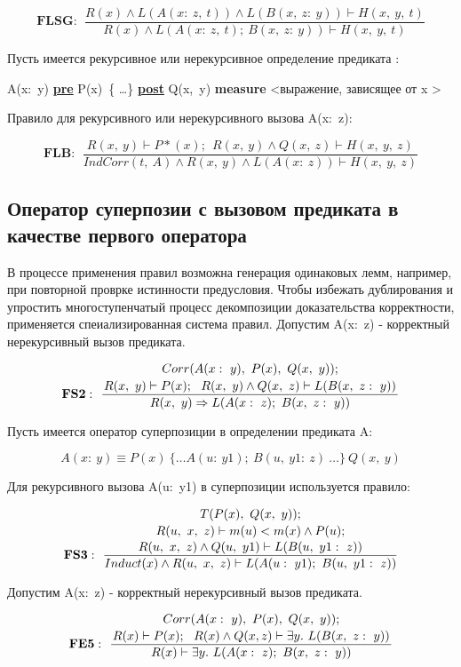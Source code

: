 \documentclass[10pt,a4paper]{article}
\newcommand{\ruleI}[3] {
$$
\mathbf{#1:} ~~
\frac{#2}{#3}
$$
}
\newcommand{\ruleII}[4] {
\ruleI{#1}
{\genfrac{}{}{0pt}{0}{#2}{#3}}
{#4}
}
\newcommand{\ruleIII}[5] {
\ruleII{#1}
{\genfrac{}{}{0pt}{0}{#2}{#3}}
{#4}
{#5}
}
\newcommand{\numformula}[2] {
\begin{equation}
\label{eq:#1}
#2
\end{equation}
}
\begin{document}
\ruleI{FLSG}
{R(x) \land L(A(x:~z,~t)) \land L(B(x,~z:~y)) \vdash H(x,~y,~t)}
{R(x) \land L(A(x:~z,~t);~B(x,~z:~y)) \vdash H(x,~y,~t)}

Пусть имеется рекурсивное или нерекурсивное определение предиката :

\begin{center}
A(x: y) \underline{\textbf{pre}} P(x) \{ \ldots \} \underline{\textbf{post}} Q(x, y) \textbf{measure} <выражение, зависящее от x >
\end{center}

Правило для рекурсивного или нерекурсивного вызова A(x: z):

\ruleI{FLB}
{R(x,~y) \vdash P*(x);~~R(x,~y) \land Q(x,~z) \vdash H(x,~y,~z)}
{IndCorr(t,~A) \land R(x,~y)\land L(A(x:~z)) \vdash H(x,~y,~z)}

\subsection{Оператор суперпозии с вызовом предиката в качестве первого оператора}
\label{ex:suppredcall}

В процессе применения правил возможна генерация одинаковых лемм, например, при повторной проврке истинности предусловия. Чтобы избежать дублирования и упростить многоступенчатый процесс декомпозиции доказательства корректности, применяется спеиализированная система правил. Допустим A(x: z) - корректный нерекурсивный вызов предиката.

\ruleII{FS2}
{Corr(A(x:~y),~P(x),~Q(x,~y));}
{R(x,~y) \vdash P(x);~~R(x,~y) \land Q(x,~z) \vdash L(B(x,~z:~y))}
{R(x,~y) \Rightarrow L(A(x:~z);~B(x,~z:~y))}

Пусть имеется оператор суперпозиции в определении предиката A:

\numformula{suppred} {
A(x:~y) \equiv P(x)~\{\ldots A(u:~y1);~B(u,~y1:~z)~\ldots \}~Q(x,~y)
}

Для рекурсивного вызова A(u: y1) в суперпозиции используется правило:

\ruleIII{FS3}
{T(P(x),~Q(x,~y));}
{R(u,~x,~z) \vdash m(u)<m(x) \land P(u);}
{R(u,~x,~z) \land Q(u,~y1) \vdash L(B(u,~y1:~z))}
{Induct(x) \land R(u,~x,~z) \vdash L(A(u:~y1);~B(u,~y1:~z))}

Допустим A(x: z) - корректный нерекурсивный вызов предиката.

\ruleII{FE5}
{Corr(A(x:~y),~P(x),~Q(x,~y));}
{R(x) \vdash P(x);~~R(x) \land Q(x, z) \vdash \exists y.~L(B(x,~z:~y))}
{R(x) \vdash \exists y.~L(A(x:~z);~B(x,~z:~y))}
\end{document}
